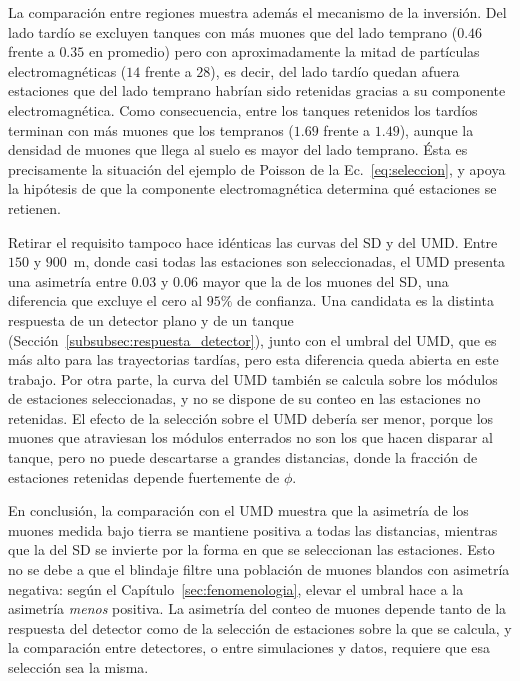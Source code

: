 La comparación entre regiones muestra además el mecanismo de la inversión. Del lado tardío se excluyen tanques con más muones que del lado temprano ($0.46$ frente a $0.35$ en promedio) pero con aproximadamente la mitad de partículas electromagnéticas ($14$ frente a $28$), es decir, del lado tardío quedan afuera estaciones que del lado temprano habrían sido retenidas gracias a su componente electromagnética. Como consecuencia, entre los tanques retenidos los tardíos terminan con más muones que los tempranos ($1.69$ frente a $1.49$), aunque la densidad de muones que llega al suelo es mayor del lado temprano. Ésta es precisamente la situación del ejemplo de Poisson de la Ec.~\ref{eq:seleccion}, y apoya la hipótesis de que la componente electromagnética determina qué estaciones se retienen.

Retirar el requisito tampoco hace idénticas las curvas del SD y del UMD. Entre $150$ y $900$~m, donde casi todas las estaciones son seleccionadas, el UMD presenta una asimetría entre $0.03$ y $0.06$ mayor que la de los muones del SD, una diferencia que excluye el cero al $95\%$ de confianza. Una candidata es la distinta respuesta de un detector plano y de un tanque (Sección~\ref{subsubsec:respuesta_detector}), junto con el umbral del UMD, que es más alto para las trayectorias tardías, pero esta diferencia queda abierta en este trabajo. Por otra parte, la curva del UMD también se calcula sobre los módulos de estaciones seleccionadas, y no se dispone de su conteo en las estaciones no retenidas. El efecto de la selección sobre el UMD debería ser menor, porque los muones que atraviesan los módulos enterrados no son los que hacen disparar al tanque, pero no puede descartarse a grandes distancias, donde la fracción de estaciones retenidas depende fuertemente de $\phi$.

En conclusión, la comparación con el UMD muestra que la asimetría de los muones medida bajo tierra se mantiene positiva a todas las distancias, mientras que la del SD se invierte por la forma en que se seleccionan las estaciones. Esto no se debe a que el blindaje filtre una población de muones blandos con asimetría negativa: según el Capítulo~\ref{sec:fenomenologia}, elevar el umbral hace a la asimetría \textit{menos} positiva. La asimetría del conteo de muones depende tanto de la respuesta del detector como de la selección de estaciones sobre la que se calcula, y la comparación entre detectores, o entre simulaciones y datos, requiere que esa selección sea la misma.

